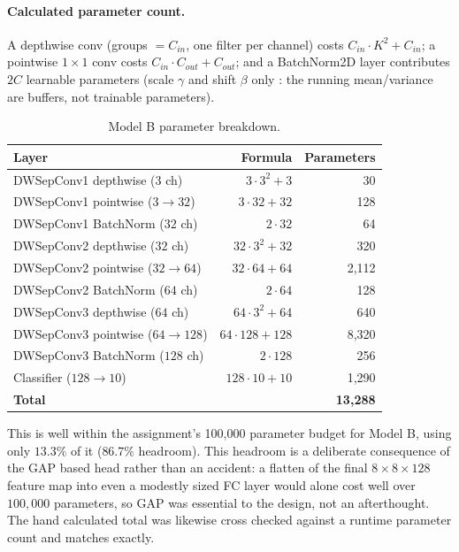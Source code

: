 \documentclass[11pt]{article}
\begin{document}
\paragraph{Calculated parameter count.} A depthwise conv (groups $=
C_{in}$, one filter per channel) costs $C_{in} \cdot K^2 + C_{in}$; a
pointwise $1\times1$ conv costs $C_{in} \cdot C_{out} + C_{out}$; and a
BatchNorm2D layer contributes $2C$ learnable parameters (scale $\gamma$ and
shift $\beta$ only : the running mean/variance are buffers, not trainable
parameters).

\begin{table}[H]
\centering
\caption{Model B parameter breakdown.}
\label{tab:model-b-params}
\begin{tabular}{lrr}
\toprule
Layer & Formula & Parameters \\
\midrule
DWSepConv1 depthwise ($3$ ch) & $3 \cdot 3^2 + 3$ & 30 \\
DWSepConv1 pointwise ($3 \rightarrow 32$) & $3 \cdot 32 + 32$ & 128 \\
DWSepConv1 BatchNorm ($32$ ch) & $2 \cdot 32$ & 64 \\
DWSepConv2 depthwise ($32$ ch) & $32 \cdot 3^2 + 32$ & 320 \\
DWSepConv2 pointwise ($32 \rightarrow 64$) & $32 \cdot 64 + 64$ & 2{,}112 \\
DWSepConv2 BatchNorm ($64$ ch) & $2 \cdot 64$ & 128 \\
DWSepConv3 depthwise ($64$ ch) & $64 \cdot 3^2 + 64$ & 640 \\
DWSepConv3 pointwise ($64 \rightarrow 128$) & $64 \cdot 128 + 128$ & 8{,}320 \\
DWSepConv3 BatchNorm ($128$ ch) & $2 \cdot 128$ & 256 \\
Classifier ($128 \rightarrow 10$) & $128 \cdot 10 + 10$ & 1{,}290 \\
\midrule
\textbf{Total} & & \textbf{13{,}288} \\
\bottomrule
\end{tabular}
\end{table}

This is well within the assignment's 100{,}000 parameter budget for Model B,
using only $13.3\%$ of it ($86.7\%$ headroom). This headroom is a deliberate
consequence of the GAP based head rather than an accident: a flatten of the
final $8\times8\times128$ feature map into even a modestly sized FC layer
would alone cost well over $100{,}000$ parameters, so GAP was essential to
the design, not an afterthought. The hand calculated total was likewise
cross checked against a runtime parameter count and matches exactly.
\end{document}
